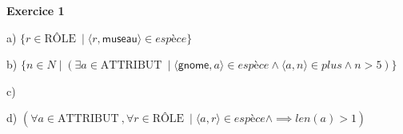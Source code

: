 \documentclass{article}
\newcommand{\role}{\mbox{RÔLE}}
\newcommand{\attribut}{\mbox{ATTRIBUT}}
\begin{document}
\textbf{Exercice 1}

a) $\{ r \in \role\ \mid \langle r, \textsf{museau} \rangle \in \textit{espèce} \}$

b) $\{ n \in N \mid (\exists a \in \attribut\ \mid \langle \textsf{gnome},a  \rangle \in \textit{espèce} \land \langle a,n \rangle \in \textit{plus} \land n > 5 )\}$

c) 

d) $ ( \forall a \in \attribut\ , \forall r \in \role\ \mid \langle a,r \rangle \in \textit{espèce} \land  \implies \textit{len}(a)> 1) $

\vspace{0.5cm}
\end{document}
